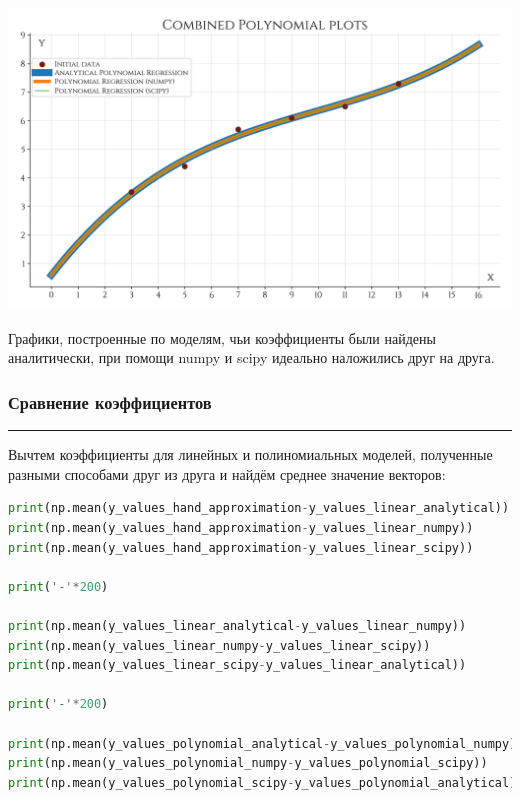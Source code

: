 \documentclass[a4paper, 14pt]{extarticle}
\begin{document}
\begin{center}
    \includegraphics[width=1\textwidth, height=1\textheight, keepaspectratio]{Combined_Polynomial_Plots} \\
\end{center}

Графики, построенные по моделям, чьи коэффициенты были найдены аналитически, при помощи numpy и scipy 
идеально наложились друг на друга.

\subsubsection*{{Сравнение коэффициентов}}\vspace{-20pt}\rule{\linewidth}{0.1mm}

Вычтем коэффициенты для линейных и полиномиальных моделей, полученные разными способами 
друг из друга и найдём среднее значение векторов:

\begin{center}
    \begin{lstlisting}[language=Python]
print(np.mean(y_values_hand_approximation-y_values_linear_analytical))
print(np.mean(y_values_hand_approximation-y_values_linear_numpy))
print(np.mean(y_values_hand_approximation-y_values_linear_scipy))

print('-'*200)

print(np.mean(y_values_linear_analytical-y_values_linear_numpy))
print(np.mean(y_values_linear_numpy-y_values_linear_scipy))
print(np.mean(y_values_linear_scipy-y_values_linear_analytical))

print('-'*200)

print(np.mean(y_values_polynomial_analytical-y_values_polynomial_numpy))
print(np.mean(y_values_polynomial_numpy-y_values_polynomial_scipy))
print(np.mean(y_values_polynomial_scipy-y_values_polynomial_analytical))
    \end{lstlisting}
\end{center}
\end{document}
